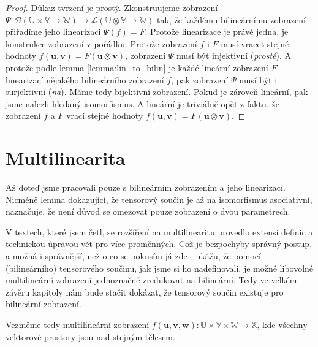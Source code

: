 \documentclass[a5paper,12pt]{amsbook}
\theoremstyle{definition}
\newcommand{\myvec}[1]{\bm{#1}}
\newcommand{\myspace}[1]{\mathbb{#1}}
\begin{document}
\begin{proof}
Důkaz tvrzení je prostý. Zkonstruujeme zobrazení $\Psi: \mathcal{B}(\myspace{U}\times\myspace{V}\rightarrow\myspace{W}) \rightarrow
\mathcal{L}(\myspace{U}\otimes\myspace{V}\rightarrow\myspace{W})$ tak, že každému
bilineárnímu zobrazení přiřadíme jeho linearizaci $\Psi(f) = F$. Protože linearizace
je právě jedna, je konstrukce zobrazení v pořádku. Protože zobrazení $f$ i $F$ musí vracet
stejné hodnoty $f(\myvec{u}, \myvec{v}) = F(\myvec{u}\otimes\myvec{v})$, zobrazení $\Psi$
musí být injektivní (\textit{prosté}). A protože podle lemma \ref{lemma:lin_to_bilin}
je každé lineární zobrazení $F$ linearizací nějakého bilineárního zobrazení $f$, pak zobrazení
$\Psi$ musí být i surjektivní (\textit{na}). Máme tedy bijektivní zobrazení. Pokud je zároveň
lineární, pak jsme nalezli hledaný isomorfismus. A lineární je triviálně opět z faktu,
že zobrazení $f$ a $F$ vrací stejné hodnoty $f(\myvec{u}, \myvec{v}) = F(\myvec{u}\otimes\myvec{v})$.
\end{proof}

\section{Multilinearita}

\noindent
Až doteď jsme pracovali pouze s bilineárním zobrazením a jeho linearizací. Nicméně lemma dokazující, že
tensorový součin je až na isomorfismus asociativní, naznačuje, že není důvod se omezovat pouze zobrazení
o dvou parametrech.

V textech, které jsem četl, se rozšíření na multilinearitu provedlo extensí definic a technickou
úpravou vět pro více proměnných. Což je bezpochyby správný postup, a možná i správnější, než o co
se pokusím já zde - ukážu, že pomocí (bilineárního) tensorového součinu, jak jsme si ho nadefinovali,
je možné libovolné multilineární zobrazení jednoznačně zredukovat na bilineární. Tedy ve velkém závěru
kapitoly nám bude stačit dokázat, že tensorový součin existuje pro bilineární zobrazení.

Vezměme tedy multilineární zobrazení $f(\myvec{u}, \myvec{v}, \myvec{w}):
\myspace{U}\times\myspace{V}\times\myspace{W}\rightarrow\myspace{X}$, kde všechny vektorové prostory
jsou nad stejným tělesem.
\end{document}
